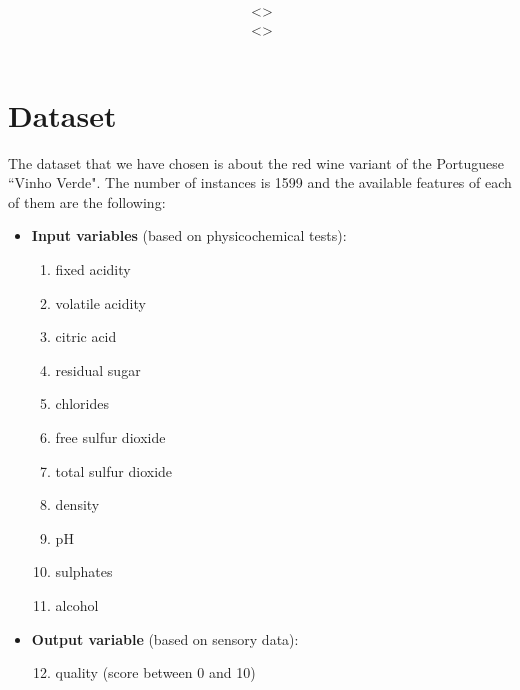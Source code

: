 \documentclass[12pt,a4paper]{article}
\title{\vspace{2in}\textmd{\hmwkClass\\\textbf{\hmwkTitle}}\\\normalsize\vspace{0.1in}\small{\hmwkDueDate}\\\vspace{4in}}
\date{}
\author{\textbf{\hmwkAuthorNameA} $\;$<\texttt{\href{mailto:laane2@illinois.edu}{\hmwkAuthorEmailA}}>\\\textbf{\hmwkAuthorNameB} $\;$<\texttt{\href{mailto:ruizcep2@illinois.edu}{\hmwkAuthorEmailB}}>}
\begin{document}
\begin{singlespace}

\begin{titlepage}
\maketitle
\thispagestyle{empty}
\end{titlepage}

\newpage


\clearpage

\section{Dataset}

The dataset that we have chosen is about the red wine variant of the Portuguese ``Vinho Verde". The number of instances is 1599 and the available features of each of them are the following:

\begin{itemize}
    \item \textbf{Input variables} (based on physicochemical tests): 
    \begin{enumerate}
        \item fixed acidity 
        \item volatile acidity 
        \item citric acid 
        \item residual sugar 
        \item chlorides 
        \item free sulfur dioxide 
        \item total sulfur dioxide 
        \item density 
        \item pH 
        \item sulphates 
        \item alcohol 
    \end{enumerate}
    
    \item \textbf{Output variable} (based on sensory data): 
    \begin{enumerate}
        \setcounter{enumi}{11}
        \item quality (score between 0 and 10)
    \end{enumerate}
\end{itemize}


\end{singlespace}
\end{document}
